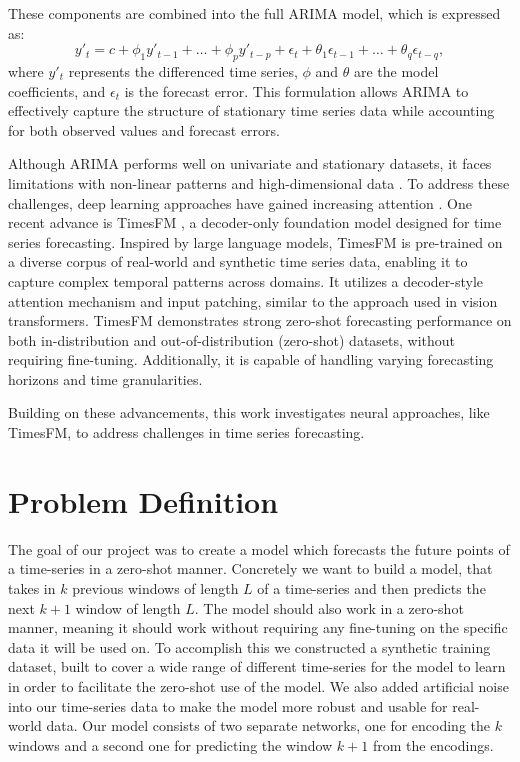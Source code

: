 \documentclass{article}
\theoremstyle{plain}
\theoremstyle{definition}
\theoremstyle{remark}
\begin{document}
These components are combined into the full ARIMA model, which is expressed as:
\begin{equation}
y'_t = c + \phi_1 y'_{t-1} + \dots + \phi_p y'_{t-p} + \epsilon_t + \theta_1 \epsilon_{t-1} + \dots + \theta_q \epsilon_{t-q},
\end{equation}
where $y'_t$ represents the differenced time series, $\phi$ and $\theta$ are the model coefficients, and $\epsilon_t$ is the forecast error. This formulation allows ARIMA to effectively capture the structure of stationary time series data while accounting for both observed values and forecast errors.

Although ARIMA performs well on univariate and stationary datasets, it faces limitations with non-linear patterns and high-dimensional data \cite{stellwagen2013arima}. To address these challenges, deep learning approaches have gained increasing attention \cite{stellwagen2013arima}. One recent advance is TimesFM \cite{das2024decoderonlyfoundationmodeltimeseries}, a decoder-only foundation model designed for time series forecasting. Inspired by large language models, TimesFM is pre-trained on a diverse corpus of real-world and synthetic time series data, enabling it to capture complex temporal patterns across domains. It utilizes a decoder-style attention mechanism and input patching, similar to the approach used in vision transformers. TimesFM demonstrates strong zero-shot forecasting performance on both in-distribution and out-of-distribution (zero-shot) datasets, without requiring fine-tuning. Additionally, it is capable of handling varying forecasting horizons and time granularities.

Building on these advancements, this work investigates neural approaches, like TimesFM, to address challenges in time series forecasting.

\section{Problem Definition}
The goal of our project was to create a model which forecasts the future points of a time-series in a zero-shot manner. Concretely we want to build a model, that takes in $k$ previous windows of length $L$ of a time-series and then predicts the next $k+1$ window of length $L$. The model should also work in a zero-shot manner, meaning it should work without requiring any fine-tuning on the specific data it will be used on. To accomplish this we constructed a synthetic training dataset, built to cover a wide range of different time-series for the model to learn in order to facilitate the zero-shot use of the model. We also added artificial noise into our time-series data to make the model more robust and usable for real-world data. Our model consists  of two separate networks, one for encoding the $k$ windows and a second one for predicting the window $k+1$ from the encodings. 
\end{document}
